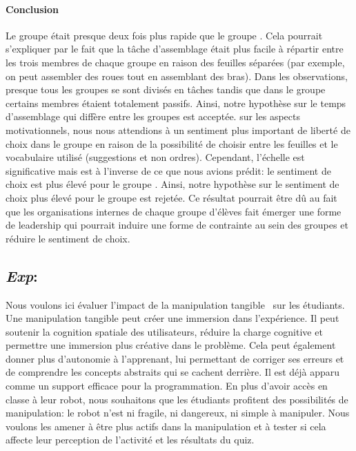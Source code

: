         \paragraph{Conclusion}
            Le groupe  était presque deux fois plus rapide que le groupe . Cela pourrait s'expliquer par le fait que la tâche d'assemblage était plus facile à répartir entre les trois membres de chaque groupe en raison des feuilles séparées (par exemple, on peut assembler des roues tout en assemblant des bras). Dans les observations, presque tous les groupes  se sont divisés en tâches tandis que dans le groupe  certains membres étaient totalement passifs. Ainsi, notre hypothèse sur le temps d'assemblage qui diffère entre les groupes est acceptée.
            sur les aspects motivationnels, nous nous attendions à un sentiment plus important de liberté de choix dans le groupe  en raison de la possibilité de choisir entre les feuilles et le vocabulaire utilisé (suggestions et non ordres). 
            Cependant, l’échelle  est significative mais est à l’inverse de ce que nous avions prédit: le sentiment de choix est plus élevé pour le groupe . Ainsi, notre hypothèse sur le sentiment de choix plus élevé pour le groupe  est rejetée. Ce résultat pourrait être dû au fait que les organisations internes de chaque groupe d'élèves fait émerger une forme de leadership qui pourrait induire une forme de contrainte au sein des groupes et réduire le sentiment de choix.
    \subsection{\textit{Exp}: }\label{Exp:poule}
            Nous voulons ici évaluer l’impact de la manipulation tangible~  sur les étudiants. Une manipulation tangible peut créer une immersion dans l'expérience. Il peut soutenir la cognition spatiale des utilisateurs, réduire la charge cognitive et permettre une immersion plus créative dans le problème. Cela peut également donner plus d'autonomie à l'apprenant, lui permettant de corriger ses erreurs et de comprendre les concepts abstraits qui se cachent derrière. Il est déjà apparu comme un support efficace pour la programmation. En plus d’avoir accès en classe à leur robot, nous souhaitons que les étudiants profitent des possibilités de manipulation: le robot n’est ni fragile, ni dangereux, ni simple à manipuler. Nous voulons les amener à être plus actifs dans la manipulation et à tester si cela affecte leur perception de l'activité et les résultats du quiz.

